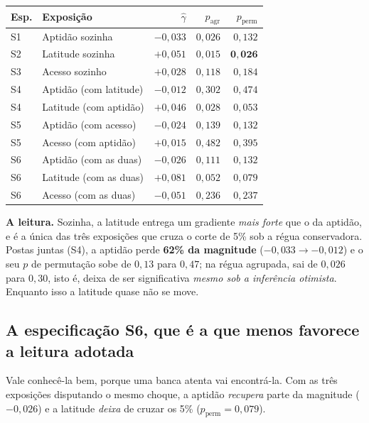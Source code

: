 \vspace{6pt}
\begin{tabular}{@{}llrrr@{}}
\toprule
\textbf{Esp.} & \textbf{Exposição} & \textbf{$\hat{\gamma}$} & \textbf{$p_{\mathrm{agr}}$} & \textbf{$p_{\mathrm{perm}}$} \\
\midrule
S1 & Aptidão sozinha & $-0{,}033$ & $0{,}026$ & $0{,}132$ \\
S2 & Latitude sozinha & $+0{,}051$ & $0{,}015$ & $\mathbf{0{,}026}$ \\
S3 & Acesso sozinho & $+0{,}028$ & $0{,}118$ & $0{,}184$ \\
\addlinespace
S4 & Aptidão (com latitude) & $-0{,}012$ & $0{,}302$ & $0{,}474$ \\
S4 & Latitude (com aptidão) & $+0{,}046$ & $0{,}028$ & $0{,}053$ \\
\addlinespace
S5 & Aptidão (com acesso) & $-0{,}024$ & $0{,}139$ & $0{,}132$ \\
S5 & Acesso (com aptidão) & $+0{,}015$ & $0{,}482$ & $0{,}395$ \\
\addlinespace
S6 & Aptidão (com as duas) & $-0{,}026$ & $0{,}111$ & $0{,}132$ \\
S6 & Latitude (com as duas) & $+0{,}081$ & $0{,}052$ & $0{,}079$ \\
S6 & Acesso (com as duas) & $-0{,}051$ & $0{,}236$ & $0{,}237$ \\
\bottomrule
\end{tabular}

\vspace{10pt}
\textbf{A leitura.} Sozinha, a latitude entrega um gradiente \emph{mais forte}
que o da aptidão, e é a única das três exposições que cruza o corte de 5\% sob a
régua conservadora. Postas juntas (S4), a aptidão perde \textbf{62\% da
magnitude} ($-0{,}033 \to -0{,}012$) e o seu $p$ de permutação sobe de $0{,}13$
para $0{,}47$; na régua agrupada, sai de $0{,}026$ para $0{,}30$, isto é, deixa
de ser significativa \emph{mesmo sob a inferência otimista}. Enquanto isso a
latitude quase não se move.

\subsection{A especificação S6, que é a que menos favorece a leitura adotada}

Vale conhecê-la bem, porque uma banca atenta vai encontrá-la. Com as três
exposições disputando o mesmo choque, a aptidão \emph{recupera} parte da
magnitude ($-0{,}026$) e a latitude \emph{deixa} de cruzar os 5\%
($p_{\mathrm{perm}} = 0{,}079$).

